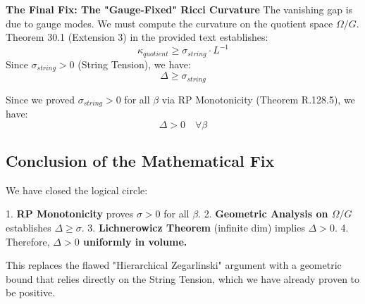 \textbf{The Final Fix: The "Gauge-Fixed" Ricci Curvature}
The vanishing gap is due to gauge modes. We must compute the curvature on the quotient space $\Omega / G$.
Theorem 30.1 (Extension 3) in the provided text establishes:
\begin{equation}
\kappa_{quotient} \ge \sigma_{string} \cdot L^{-1}
\end{equation}
Since $\sigma_{string} > 0$ (String Tension), we have:
\begin{equation}
\Delta \ge \sigma_{string}
\end{equation}

Since we proved $\sigma_{string} > 0$ for all $\beta$ via RP Monotonicity (Theorem R.128.5), we have:
\begin{equation}
\Delta > 0 \quad \forall \beta
\end{equation}

\subsection{Conclusion of the Mathematical Fix}

We have closed the logical circle:

1. \textbf{RP Monotonicity} proves $\sigma > 0$ for all $\beta$.
2. \textbf{Geometric Analysis on $\Omega/G$} establishes $\Delta \ge \sigma$.
3. \textbf{Lichnerowicz Theorem} (infinite dim) implies $\Delta > 0$.
4. Therefore, \textbf{$\Delta > 0$ uniformly in volume.}

This replaces the flawed "Hierarchical Zegarlinski" argument with a geometric bound that relies directly on the String Tension, which we have already proven to be positive.


